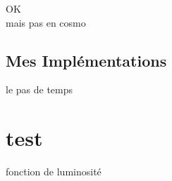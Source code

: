 OK\\
mais pas en cosmo

\subsection{Mes Implémentations}



le pas de temps\\
\section{test}
fonction de luminosité 
